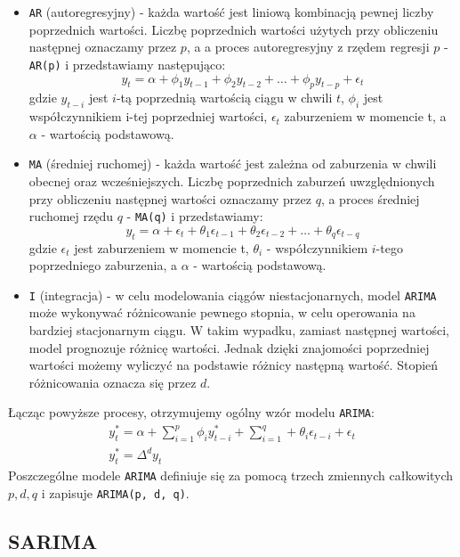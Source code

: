 \documentclass[12pt]{article}
\begin{document}
\begin{itemize}
    \item \texttt{AR} (autoregresyjny) - każda wartość jest liniową kombinacją pewnej liczby poprzednich wartości. Liczbę poprzednich wartości użytych przy obliczeniu następnej oznaczamy przez $p$, a a proces autoregresyjny z rzędem regresji $p$ - \texttt{AR(p)} i przedstawiamy następująco:
          \[
              y_t = \alpha + \phi_1y_{t-1} + \phi_2y_{t-2} + \dots + \phi_py_{t-p} + \epsilon_t
          \]
          gdzie $y_{t-i}$ jest $i$-tą poprzednią wartością ciągu w chwili $t$, $\phi_i$ jest współczynnikiem i-tej poprzedniej wartości, $\epsilon_t$ zaburzeniem w momencie t, a $\alpha$ - wartością podstawową.
    \item \texttt{MA} (średniej ruchomej) - każda wartość jest zależna od zaburzenia w chwili obecnej oraz wcześniejszych. Liczbę poprzednich zaburzeń uwzględnionych przy obliczeniu następnej wartości oznaczamy przez $q$, a proces średniej ruchomej rzędu $q$ - \texttt{MA(q)} i przedstawiamy:
          \[
              y_t = \alpha + \epsilon_t + \theta_1\epsilon_{t-1} + \theta_2\epsilon_{t-2} + \dots + \theta_q\epsilon_{t-q}
          \]
          gdzie $\epsilon_t$ jest zaburzeniem w momencie t, $\theta_i$ - współczynnikiem $i$-tego poprzedniego zaburzenia, a $\alpha$ - wartością podstawową.
    \item \texttt{I} (integracja) - w celu modelowania ciągów niestacjonarnych, model \texttt{ARIMA} może wykonywać różnicowanie pewnego stopnia, w celu operowania na bardziej stacjonarnym ciągu. W takim wypadku, zamiast następnej wartości, model prognozuje różnicę wartości. Jednak dzięki znajomości poprzedniej wartości możemy wyliczyć na podstawie różnicy następną wartość. Stopień różnicowania oznacza się przez $d$.
\end{itemize}

Łącząc powyższe procesy, otrzymujemy ogólny wzór modelu \texttt{ARIMA}:
\begin{gather*}
    y_t^* = \alpha + \sum^p_{i=1}\phi_iy^*_{t-i} + \sum^q_{i=1} + \theta_i\epsilon_{t-i} + \epsilon_t \\
    y_t^* = \Delta^dy_t
\end{gather*}
Poszczególne modele \texttt{ARIMA} definiuje się za pomocą trzech zmiennych całkowitych $p, d, q$ i zapisuje \texttt{ARIMA(p, d, q)}.

\subsection{SARIMA}
\end{document}
